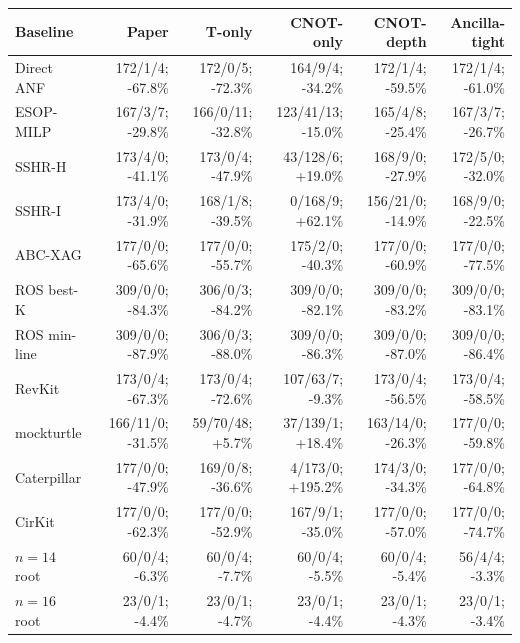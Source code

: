 \begin{tabular}{@{}lrrrrr@{}}
\toprule
Baseline & Paper & T-only & CNOT-only & CNOT-depth & Ancilla-tight \\
\midrule
Direct ANF & 172/1/4; -67.8\% & 172/0/5; -72.3\% & 164/9/4; -34.2\% & 172/1/4; -59.5\% & 172/1/4; -61.0\% \\
ESOP-MILP & 167/3/7; -29.8\% & 166/0/11; -32.8\% & 123/41/13; -15.0\% & 165/4/8; -25.4\% & 167/3/7; -26.7\% \\
SSHR-H & 173/4/0; -41.1\% & 173/0/4; -47.9\% & 43/128/6; +19.0\% & 168/9/0; -27.9\% & 172/5/0; -32.0\% \\
SSHR-I & 173/4/0; -31.9\% & 168/1/8; -39.5\% & 0/168/9; +62.1\% & 156/21/0; -14.9\% & 168/9/0; -22.5\% \\
ABC-XAG & 177/0/0; -65.6\% & 177/0/0; -55.7\% & 175/2/0; -40.3\% & 177/0/0; -60.9\% & 177/0/0; -77.5\% \\
ROS best-K & 309/0/0; -84.3\% & 306/0/3; -84.2\% & 309/0/0; -82.1\% & 309/0/0; -83.2\% & 309/0/0; -83.1\% \\
ROS min-line & 309/0/0; -87.9\% & 306/0/3; -88.0\% & 309/0/0; -86.3\% & 309/0/0; -87.0\% & 309/0/0; -86.4\% \\
RevKit & 173/0/4; -67.3\% & 173/0/4; -72.6\% & 107/63/7; -9.3\% & 173/0/4; -56.5\% & 173/0/4; -58.5\% \\
mockturtle & 166/11/0; -31.5\% & 59/70/48; +5.7\% & 37/139/1; +18.4\% & 163/14/0; -26.3\% & 177/0/0; -59.8\% \\
Caterpillar & 177/0/0; -47.9\% & 169/0/8; -36.6\% & 4/173/0; +195.2\% & 174/3/0; -34.3\% & 177/0/0; -64.8\% \\
CirKit & 177/0/0; -62.3\% & 177/0/0; -52.9\% & 167/9/1; -35.0\% & 177/0/0; -57.0\% & 177/0/0; -74.7\% \\
$n=14$ root & 60/0/4; -6.3\% & 60/0/4; -7.7\% & 60/0/4; -5.5\% & 60/0/4; -5.4\% & 56/4/4; -3.3\% \\
$n=16$ root & 23/0/1; -4.4\% & 23/0/1; -4.7\% & 23/0/1; -4.4\% & 23/0/1; -4.3\% & 23/0/1; -3.4\% \\
\bottomrule
\end{tabular}
